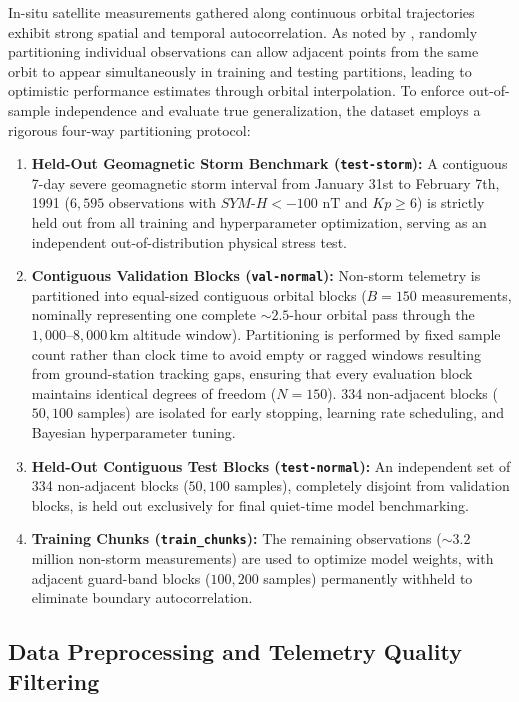 \documentclass{agujournal2019}
\begin{document}
In-situ satellite measurements gathered along continuous orbital trajectories exhibit strong spatial and temporal autocorrelation. As noted by \cite{smirnov_calibration_2024}, randomly partitioning individual observations can allow adjacent points from the same orbit to appear simultaneously in training and testing partitions, leading to optimistic performance estimates through orbital interpolation. To enforce out-of-sample independence and evaluate true generalization, the dataset employs a rigorous four-way partitioning protocol:
\begin{enumerate}
    \item \textbf{Held-Out Geomagnetic Storm Benchmark (\texttt{test-storm}):} A contiguous 7-day severe geomagnetic storm interval from January 31st to February 7th, 1991 \citep{liemohn_ring_2000} ($6{,}595$ observations with $SYM\text{-}H < -100\text{ nT}$ and $Kp \ge 6$) is strictly held out from all training and hyperparameter optimization, serving as an independent out-of-distribution physical stress test.
    \item \textbf{Contiguous Validation Blocks (\texttt{val-normal}):} Non-storm telemetry is partitioned into equal-sized contiguous orbital blocks ($B = 150$ measurements, nominally representing one complete $\sim 2.5$-hour orbital pass through the $1{,}000$--$8{,}000$\,km altitude window). Partitioning is performed by fixed sample count rather than clock time to avoid empty or ragged windows resulting from ground-station tracking gaps, ensuring that every evaluation block maintains identical degrees of freedom ($N = 150$). 334 non-adjacent blocks ($50{,}100$ samples) are isolated for early stopping, learning rate scheduling, and Bayesian hyperparameter tuning.
    \item \textbf{Held-Out Contiguous Test Blocks (\texttt{test-normal}):} An independent set of 334 non-adjacent blocks ($50{,}100$ samples), completely disjoint from validation blocks, is held out exclusively for final quiet-time model benchmarking.
    \item \textbf{Training Chunks (\texttt{train\_chunks}):} The remaining observations ($\sim 3.2$\,million non-storm measurements) are used to optimize model weights, with adjacent guard-band blocks ($100{,}200$ samples) permanently withheld to eliminate boundary autocorrelation.
\end{enumerate}

\subsection{Data Preprocessing and Telemetry Quality Filtering}
\label{data:preprocessing}
\end{document}
